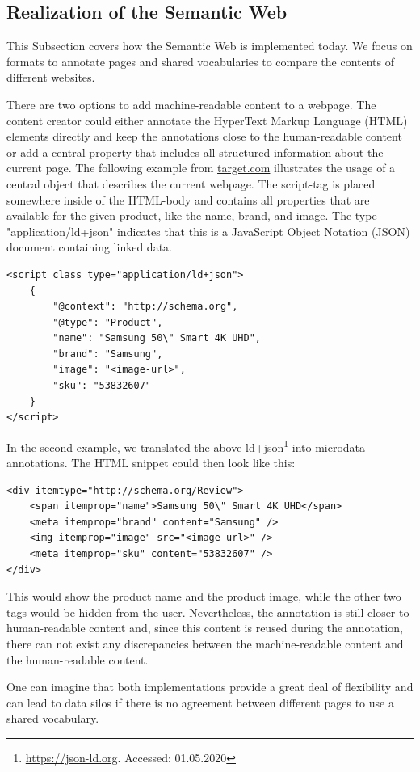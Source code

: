 \subsection{Realization of the Semantic Web}
\label{subsec:semantic-web-realization}

This Subsection covers how the Semantic Web is implemented today.
We focus on formats to annotate pages and shared vocabularies to compare the contents of different websites.

There are two options to add machine-readable content to a webpage.
The content creator could either annotate the HyperText Markup Language (HTML) elements directly and keep the annotations close to
the human-readable content or add a central property that includes all structured information about the
current page.
The following example from \url{target.com} illustrates the usage of a central object that describes the
current webpage.
The script-tag is placed somewhere inside of the HTML-body and contains all properties that are available
for the given product, like the name, brand, and image.
The type "application/ld+json" indicates that this is a JavaScript Object Notation (JSON) document containing linked data.
\begin{verbatim}
<script class type="application/ld+json">
    {
        "@context": "http://schema.org",
        "@type": "Product",
        "name": "Samsung 50\" Smart 4K UHD",
        "brand": "Samsung",
        "image": "<image-url>",
        "sku": "53832607"
    }
</script>
\end{verbatim}
In the second example, we translated the above ld+json\footnote{\url{https://json-ld.org}. Accessed: 01.05.2020} into microdata annotations.
The HTML snippet could then look like this:
\begin{verbatim}
<div itemtype="http://schema.org/Review">
    <span itemprop="name">Samsung 50\" Smart 4K UHD</span>
    <meta itemprop="brand" content="Samsung" />
    <img itemprop="image" src="<image-url>" />
    <meta itemprop="sku" content="53832607" />
</div>
\end{verbatim}
This would show the product name and the product image, while the other two tags would be hidden from the user.
Nevertheless, the annotation is still closer to human-readable content and, since this content is reused during the
annotation, there can not exist any discrepancies between the machine-readable content and the human-readable content.

One can imagine that both implementations provide a great deal of flexibility and can lead to data silos if there
is no agreement between different pages to use a shared vocabulary.

